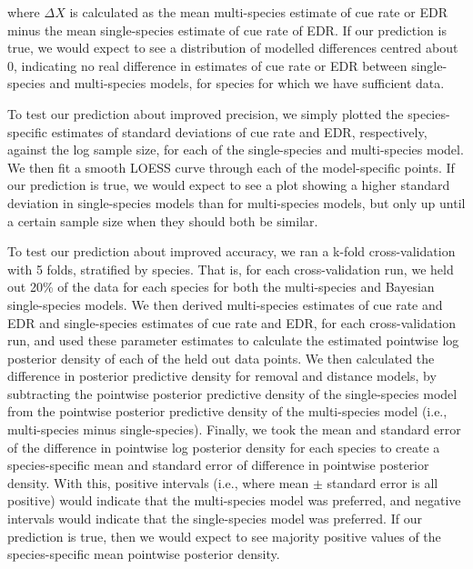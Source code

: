 \documentclass[12pt]{article}
\begin{document}
where $\Delta X$ is calculated as the mean multi-species estimate of cue rate or EDR minus the mean single-species estimate of cue rate of EDR.
If our prediction is true, we would expect to see a distribution of modelled differences centred about 0, indicating no real difference in estimates of cue rate or EDR between single-species and multi-species models, for species for which we have sufficient data.

\par To test our prediction about improved precision, we simply plotted the species-specific estimates of standard deviations of cue rate and EDR, respectively, against the log sample size, for each of the single-species and multi-species model. 
We then fit a smooth LOESS curve through each of the model-specific points.
If our prediction is true, we would expect to see a plot showing a higher standard deviation in single-species models than for multi-species models, but only up until a certain sample size when they should both be similar.

\par To test our prediction about improved accuracy, we ran a k-fold cross-validation with 5 folds, stratified by species.
That is, for each cross-validation run, we held out 20\% of the data for each species for both the multi-species and Bayesian single-species models. 
We then derived multi-species estimates of cue rate and EDR and single-species estimates of cue rate and EDR, for each cross-validation run, and used these parameter estimates to calculate the estimated pointwise log posterior density of each of the held out data points. 
We then calculated the difference in posterior predictive density for removal and distance models, by subtracting the pointwise posterior predictive density of the single-species model from the pointwise posterior predictive density of the multi-species model (i.e., multi-species minus single-species).
Finally, we took the mean and standard error of the difference in pointwise log posterior density for each species to create a species-specific mean and standard error of difference in pointwise posterior density.
With this, positive intervals (i.e., where mean $\pm$ standard error is all positive) would indicate that the multi-species model was preferred, and negative intervals would indicate that the single-species model was preferred.
If our prediction is true, then we would expect to see majority positive values of the species-specific mean pointwise posterior density.
\end{document}
